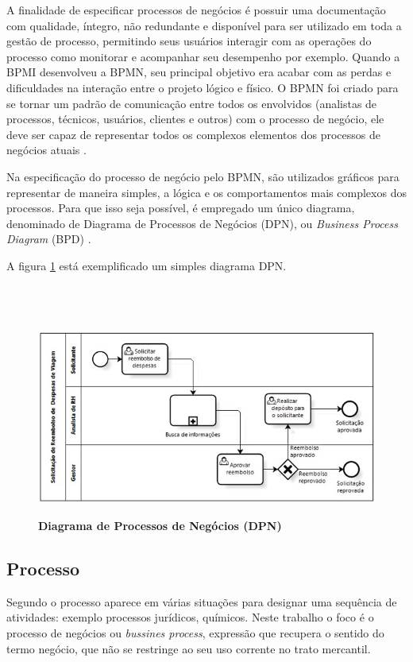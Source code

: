 \documentclass[
	12pt,				%
	openright,			%
	oneside,			%
	a4paper,			%
	chapter=TITLE,		%
	section=TITLE,		%
	english,			%
	french,				%
	spanish,			%
	brazil				%
	]{abntex2}
\begin{document}
A finalidade de especificar processos de negócios é possuir uma documentação com qualidade, íntegro, não redundante e disponível para ser utilizado em toda a gestão de processo, permitindo seus usuários interagir com as operações do processo como monitorar e acompanhar seu desempenho por exemplo. Quando a BPMI desenvolveu a BPMN, seu principal objetivo era acabar com as perdas e dificuldades na interação entre o projeto lógico e físico. O BPMN foi criado para se tornar um padrão de comunicação entre todos os envolvidos (analistas de processos, técnicos, usuários, clientes e outros) com o processo de negócio, ele deve ser capaz de representar todos os complexos elementos dos processos de negócios atuais \cite{sordiGestaoModerna}.

Na especificação do processo de negócio pelo BPMN, são utilizados gráficos para representar de maneira simples, a lógica e os comportamentos mais complexos dos processos. Para que isso seja possível, é empregado um único diagrama, denominado de Diagrama de Processos de Negócios (DPN), ou \textit{Business Process Diagram} (BPD) \cite{araujoGestao}.

A figura \ref{fig-bpmn-exemplo} está exemplificado um simples diagrama DPN.
\\ \\ \\ \\ 

\begin{figure}[htb]
	\begin{center}
		\caption{
			\textbf{Diagrama de Processos de Negócios (DPN)}
		}\label{fig-bpmn-exemplo}
		\includegraphics [scale=0.8]{imagens/bpmn_exemplo.jpg}
		\label{fig-bpmn-exemplo}
	\end{center}
\end{figure}
 

\subsection{Processo}
Segundo  o processo aparece em várias situações para designar uma sequência de atividades: exemplo processos jurídicos, químicos. Neste trabalho o foco é o processo de negócios ou \textit{bussines process}, expressão que recupera o sentido do termo negócio, que não se restringe ao seu uso corrente no trato mercantil. 
\end{document}
